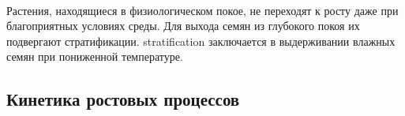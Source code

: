 \paragraph*{}Растения, находящиеся в физиологическом покое, не переходят к росту даже при благоприятных условиях среды. Для выхода семян из глубокого покоя их подвергают стратификации. \gls{stratification} заключается в выдерживании влажных семян при пониженной температуре.



\subsection*{Кинетика ростовых процессов} 

